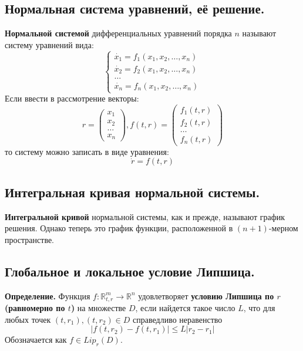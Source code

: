 \documentclass{article}
\begin{document}
\subsection{Нормальная система уравнений, её решение.}
\textbf{Нормальной системой} дифференциальных уравнений порядка $n$ называют систему уравнений вида: 
\begin{equation*}
    \begin{cases}
        \dot{x_1} = f_1(x_1, x_2, \ldots, x_n)\\
        \dot{x_2} = f_2(x_1, x_2, \ldots, x_n)\\
        \ldots\\
        \dot{x_n} = f_n(x_1, x_2, \ldots, x_n)
    \end{cases}
\end{equation*}
Если ввести в рассмотрение векторы:
\begin{equation*}
    r=
    \begin{pmatrix}
    x_1\\
    x_2\\
    \ldots\\
    x_n
    \end{pmatrix},
    f(t, r) =
    \begin{pmatrix}
    f_1(t, r)\\
    f_2(t, r)\\
    \ldots\\
    f_n(t, r)
    \end{pmatrix}
\end{equation*}
то систему можно записать в виде уравнения:
\begin{equation*}
    \dot{r} = f(t, r)
\end{equation*}

\subsection{Интегральная кривая нормальной системы.}
\textbf{Интегральной кривой} нормальной системы, как и прежде, называют график решения. Однако теперь это график функции, расположенной в $(n+1)$-мерном пространстве.

\subsection{Глобальное и локальное условие Липшица.}
\textbf{Определение.} Функция $f: \mathbb{R}_{t,r}^{m} \to \mathbb{R}^n$ удовлетворяет \textbf{условию Липшица по $r$ (равномерно по $t$)} на множестве $D$, если найдется такое число $L$, что для любых точек $(t,r_1), (t,r_2) \in D$ справедливо неравенство \begin{equation*}
    |f(t,r_2) - f(t,r_1)| \le L|r_2 - r_1|
\end{equation*}
Обозначается как $f \in Lip_r(D)$.\\
\end{document}
